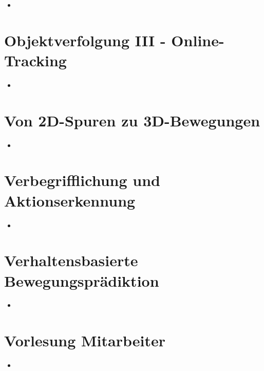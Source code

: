 \documentclass{report}
\begin{document}
	\begin{itemize}
		\item 
	\end{itemize}
	
	
	\section{Objektverfolgung III - Online-Tracking}
	
	\begin{itemize}
		\item 
	\end{itemize}
	
	
	\section{Von 2D-Spuren zu 3D-Bewegungen}
	
	\begin{itemize}
		\item 
	\end{itemize}
	
	
	\section{Verbegrifflichung und Aktionserkennung}
	
	\begin{itemize}
		\item 
	\end{itemize}
	
	
	\section{Verhaltensbasierte Bewegungsprädiktion}
	
	\begin{itemize}
		\item 
	\end{itemize}
	
	
	\section{Vorlesung Mitarbeiter}
	
	\begin{itemize}
		\item 
	\end{itemize}
	
	
\end{document}
